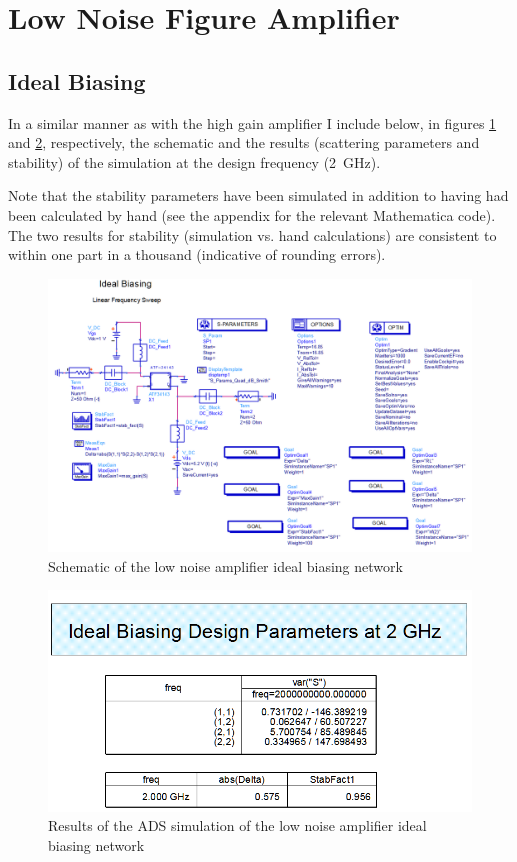 \section{Low Noise Figure Amplifier}

\subsection{Ideal Biasing}

In a similar manner as with the high gain amplifier I include below, in figures
\ref{fig:A2P2IdealSchematic} and \ref{fig:A2P2IdealBiasingResults},
respectively, the schematic and the results (scattering parameters and
stability) of the simulation at the design frequency (\SI{2}{\giga\hertz}).

Note that the stability parameters have been simulated in addition to having had
been calculated by hand (see the appendix for the relevant Mathematica code).
The two results for stability (simulation vs. hand calculations) are consistent
to within one part in a thousand (indicative of rounding errors).

\begin{figure}[H]
    \centering
    \includegraphics[width=0.8\linewidth]{Images/A2P2IdealSchematic.png}
    \caption{Schematic of the low noise amplifier ideal biasing network}
    \label{fig:A2P2IdealSchematic}
\end{figure}

\begin{figure}[H]
    \centering
    \includegraphics[width=0.8\linewidth]{Images/A2P2IdealBiasingResults.png}
    \caption{Results of the ADS simulation of the low noise amplifier ideal biasing network}
    \label{fig:A2P2IdealBiasingResults}
\end{figure}


